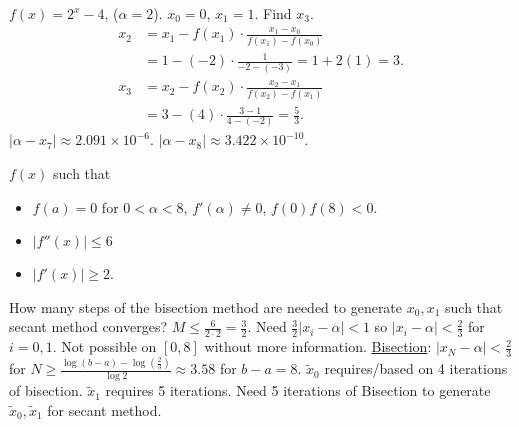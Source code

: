 \documentclass[]{article}
\begin{document}
\begin{example}
	$f(x) = 2^x-4$, ($\alpha = 2$). $x_0=0$, $x_1=1$. Find $x_3$. 
	\begin{align*}
		x_2 &= x_1-f(x_1)\cdot \frac{x_1-x_0}{f(x_1)-f(x_0)} \\
			&= 1-(-2)\cdot\frac1{-2-(-3)} = 1+2(1) = 3. \\
		x_3 &= x_2 - f(x_2) \cdot \frac{x_2-x_1}{f(x_2)-f(x_1)} \\
			&= 3-(4)\cdot\frac{3-1}{4-(-2)} = \frac53.
	\end{align*}
	$|\alpha-x_7|\approx 2.091\times10^{-6}$. $|\alpha-x_8| \approx 3.422\times10^{-10}$.
\end{example}
\begin{example}
	$f(x)$ such that
	\begin{itemize}
		\item $f(a)=0$ for $0<\alpha<8$, $f'(\alpha)\neq0$, $f(0)f(8)<0$.
		\item $|f''(x)| \leq 6$
		\item $|f'(x)|\geq 2$.
	\end{itemize}
	How many steps of the bisection method are needed to generate $x_0,x_1$ such that secant method converges?
	$ M\leq\frac6{2\cdot2} = \frac32$. Need $\frac32|x_i-\alpha|<1$ so $|x_i-\alpha|<\frac23$ for $i=0,1$.
	Not possible on $[0,8]$ without more information.
	\ul{Bisection}: $|x_N-\alpha| < \frac23$ for $N\geq \frac{\log(b-a)-\log(\frac23)}{\log 2} \approx 3.58$ for $b-a=8$.
	$\tilde x_0$ requires/based on 4 iterations of bisection.
	$\tilde x_1$ requires 5 iterations.
	Need 5 iterations of Bisection to generate $\tilde x_0,\tilde x_1$ for secant method.
\end{example}
\end{document}
